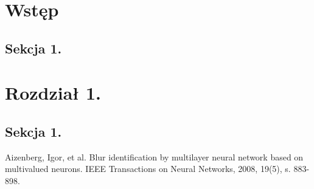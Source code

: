 \documentclass[12pt, twoside, openany]{mwrep}
\begin{document}
\tableofcontents
\clearpage

\chapter{Wstęp}
\lipsum[1-4]
\section{Sekcja 1.}
\lipsum[1-10]

\chapter{Rozdział 1.}
\lipsum[1-4]
\section{Sekcja 1.}
\lipsum[1-10]


\begin{thebibliography}{99}
 Aizenberg, Igor, et al. Blur identification by multilayer neural network based on multivalued neurons. IEEE Transactions on Neural Networks, 2008, 19(5), s. 883-898.

\end{thebibliography}

\listoffigures

\listoftables

\listofalgorithms

\end{document}
